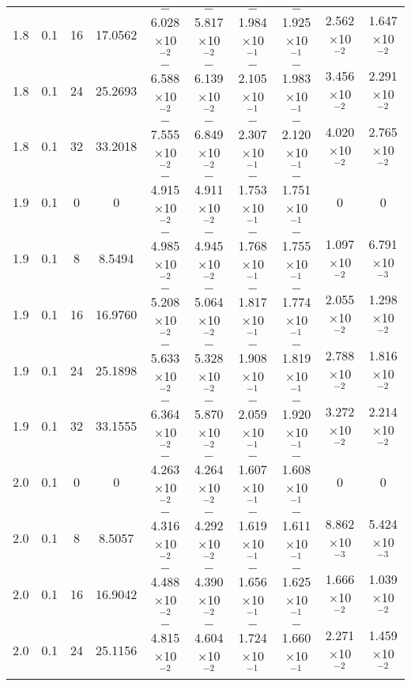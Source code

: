 \documentclass[aps,prd,twocolumn,showpacs,groupedaddress,nofootinbib]{revtex4}
\begin{document}
\begin{widetext}
\begin{table}[h]
\begin{tabular}{|c|c|c|c|c|c|c|c|c|c|}
  1.8&  0.1& 16& 17.0562& $-$6.028$\times$10$^{-2}$& $-$5.817$\times$10$^{-2}$& $-$1.984$\times$10$^{-1}$& $-$1.925$\times$10$^{-1}$&  2.562$\times$10$^{-2}$&    1.647$\times$10$^{-2}$\\
  1.8&  0.1& 24& 25.2693& $-$6.588$\times$10$^{-2}$& $-$6.139$\times$10$^{-2}$& $-$2.105$\times$10$^{-1}$& $-$1.983$\times$10$^{-1}$&  3.456$\times$10$^{-2}$&    2.291$\times$10$^{-2}$\\
  1.8&  0.1& 32& 33.2018& $-$7.555$\times$10$^{-2}$& $-$6.849$\times$10$^{-2}$& $-$2.307$\times$10$^{-1}$& $-$2.120$\times$10$^{-1}$&  4.020$\times$10$^{-2}$&    2.765$\times$10$^{-2}$\\
  1.9&  0.1&  0&  0& $-$4.915$\times$10$^{-2}$& $-$4.911$\times$10$^{-2}$& $-$1.753$\times$10$^{-1}$& $-$1.751$\times$10$^{-1}$&  0&    0\\
  1.9&  0.1&  8&  8.5494& $-$4.985$\times$10$^{-2}$& $-$4.945$\times$10$^{-2}$& $-$1.768$\times$10$^{-1}$& $-$1.755$\times$10$^{-1}$&  1.097$\times$10$^{-2}$&    6.791$\times$10$^{-3}$\\
  1.9&  0.1& 16& 16.9760& $-$5.208$\times$10$^{-2}$& $-$5.064$\times$10$^{-2}$& $-$1.817$\times$10$^{-1}$& $-$1.774$\times$10$^{-1}$&  2.055$\times$10$^{-2}$&    1.298$\times$10$^{-2}$\\
  1.9&  0.1& 24& 25.1898& $-$5.633$\times$10$^{-2}$& $-$5.328$\times$10$^{-2}$& $-$1.908$\times$10$^{-1}$& $-$1.819$\times$10$^{-1}$&  2.788$\times$10$^{-2}$&    1.816$\times$10$^{-2}$\\
  1.9&  0.1& 32& 33.1555& $-$6.364$\times$10$^{-2}$& $-$5.870$\times$10$^{-2}$& $-$2.059$\times$10$^{-1}$& $-$1.920$\times$10$^{-1}$&  3.272$\times$10$^{-2}$&    2.214$\times$10$^{-2}$\\
  2.0&  0.1&  0&  0& $-$4.263$\times$10$^{-2}$& $-$4.264$\times$10$^{-2}$& $-$1.607$\times$10$^{-1}$& $-$1.608$\times$10$^{-1}$&  0&    0\\
  2.0&  0.1&  8&  8.5057& $-$4.316$\times$10$^{-2}$& $-$4.292$\times$10$^{-2}$& $-$1.619$\times$10$^{-1}$& $-$1.611$\times$10$^{-1}$&  8.862$\times$10$^{-3}$&    5.424$\times$10$^{-3}$\\
  2.0&  0.1& 16& 16.9042& $-$4.488$\times$10$^{-2}$& $-$4.390$\times$10$^{-2}$& $-$1.656$\times$10$^{-1}$& $-$1.625$\times$10$^{-1}$&  1.666$\times$10$^{-2}$&    1.039$\times$10$^{-2}$\\
  2.0&  0.1& 24& 25.1156& $-$4.815$\times$10$^{-2}$& $-$4.604$\times$10$^{-2}$& $-$1.724$\times$10$^{-1}$& $-$1.660$\times$10$^{-1}$&  2.271$\times$10$^{-2}$&    1.459$\times$10$^{-2}$\\

\end{tabular}
\end{table}
\end{widetext}
\end{document}
